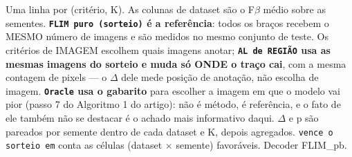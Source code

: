 \footnotesize Uma linha por (critério, K). As colunas de dataset são o F$\beta$ médio sobre as sementes. \textbf{\texttt{FLIM puro (sorteio)} é a referência}: todos os braços recebem o MESMO número de imagens e são medidos no mesmo conjunto de teste. Os critérios de IMAGEM escolhem quais imagens anotar; \textbf{\texttt{AL de REGIÃO} usa as mesmas imagens do sorteio e muda só ONDE o traço cai}, com a mesma contagem de pixels --- o $\Delta$ dele mede posição de anotação, não escolha de imagem. \textbf{\texttt{Oracle} usa o gabarito} para escolher a imagem em que o modelo vai pior (passo 7 do Algoritmo 1 do artigo): não é método, é referência, e o fato de ele também não se destacar é o achado mais informativo daqui. $\Delta$ e p são pareados por semente dentro de cada dataset e K, depois agregados. \texttt{vence o sorteio em} conta as células (dataset $\times$ semente) favoráveis. Decoder FLIM\_pb.
\normalsize
